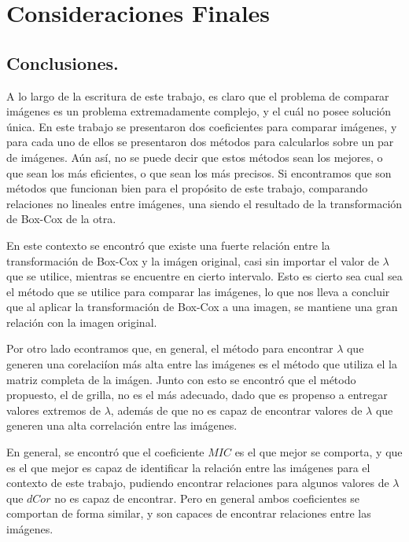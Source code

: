 \chapter{Consideraciones Finales}\label{chap6}

\section{Conclusiones.}


    A lo largo de la escritura de este trabajo, es claro que el problema de comparar im\'agenes es un problema extremadamente complejo, y el cu\'al no posee soluci\'on \'unica. En este trabajo se presentaron dos coeficientes para comparar im\'agenes, y para cada uno de ellos se presentaron dos m\'etodos para calcularlos sobre un par de im\'agenes. A\'un as\'i, no se puede decir que estos m\'etodos sean los mejores, o que sean los m\'as eficientes, o que sean los m\'as precisos. Si encontramos que son m\'etodos que funcionan bien para el prop\'osito de este trabajo, comparando relaciones no lineales entre im\'agenes, una siendo el resultado de la transformaci\'on de Box-Cox de la otra.

    En este contexto se encontr\'o que existe una fuerte relaci\'on entre la transformaci\'on de Box-Cox y la im\'agen original, casi sin importar el valor de $\lambda$ que se utilice, mientras se encuentre en cierto intervalo. Esto es cierto sea cual sea el m\'etodo que se utilice para comparar las im\'agenes, lo que nos lleva a concluir que al aplicar la transformaci\'on de Box-Cox a una imagen, se mantiene una gran relaci\'on con la imagen original.

    Por otro lado econtramos que, en general, el m\'etodo para encontrar $\lambda$ que generen una corelaci\'ion m\'as alta entre las im\'agenes es el m\'etodo que utiliza el la matriz completa de la im\'agen. Junto con esto se encontr\'o que el m\'etodo propuesto, el de grilla, no es el m\'as adecuado, dado que es propenso a entregar valores extremos de $\lambda$, además de que no es capaz de encontrar valores de $\lambda$ que generen una alta correlaci\'on entre las im\'agenes.

    En general, se encontr\'o que el coeficiente $MIC$ es el que mejor se comporta, y que es el que mejor es capaz de identificar la relaci\'on entre las im\'agenes para el contexto de este trabajo, pudiendo encontrar relaciones para algunos valores de $\lambda$ que $dCor$ no es capaz de encontrar. Pero en general ambos coeficientes se comportan de forma similar, y son capaces de encontrar relaciones entre las im\'agenes.


